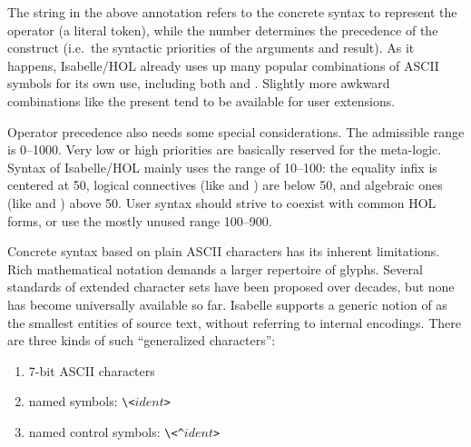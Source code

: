 \begin{isabellebody}
\begin{isamarkuptext}
  The string \isa{{\isachardoublequote}{\isacharbrackleft}{\isacharplus}{\isacharbrackright}{\isachardoublequote}} in the above annotation refers to
  the concrete syntax to represent the operator (a literal token),
  while the number  determines the precedence of the
  construct (i.e.\ the syntactic priorities of the arguments and
  result).  As it happens, Isabelle/HOL already uses up many popular
  combinations of ASCII symbols for its own use, including both \isa{{\isacharplus}} and \isa{{\isacharplus}{\isacharplus}}.  Slightly more awkward combinations like the
  present \isa{{\isacharbrackleft}{\isacharplus}{\isacharbrackright}} tend to be available for user extensions.

  Operator precedence also needs some special considerations.  The
  admissible range is 0--1000.  Very low or high priorities are
  basically reserved for the meta-logic.  Syntax of Isabelle/HOL
  mainly uses the range of 10--100: the equality infix \isa{{\isacharequal}} is
  centered at 50, logical connectives (like \isa{{\isasymor}} and \isa{{\isasymand}}) are below 50, and algebraic ones (like \isa{{\isacharplus}} and \isa{{\isacharasterisk}}) above 50.  User syntax should strive to coexist with common
  HOL forms, or use the mostly unused range 100--900.%
\end{isamarkuptext}%
\isamarkuptrue%
%
\isamarkuptrue%
%
\begin{isamarkuptext}%
Concrete syntax based on plain ASCII characters has its inherent
  limitations.  Rich mathematical notation demands a larger repertoire
  of glyphs.  Several standards of extended character sets have been
  proposed over decades, but none has become universally available so
  far.  Isabelle supports a generic notion of  as the
  smallest entities of source text, without referring to internal
  encodings.  There are three kinds of such ``generalized
  characters'':

  \begin{enumerate}

  \item 7-bit ASCII characters

  \item named symbols: \verb,\,\verb,<,$ident$\verb,>,

  \item named control symbols: \verb,\,\verb,<^,$ident$\verb,>,

  \end{enumerate}


\end{isamarkuptext}
\end{isabellebody}
